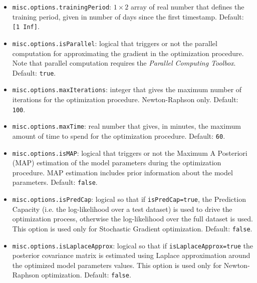 \begin{itemize}
\begin{itemize}
\item \lstinline[basicstyle = \mlttfamily \small ]!misc.options.trainingPeriod!:  $1\times2$ array of real number that defines the training period, given in number of days since the first timestamp. Default: \lstinline[basicstyle = \mlttfamily \small ]![1 Inf]!. 
\item \lstinline[basicstyle = \mlttfamily \small ]!misc.options.isParallel!: logical that triggers or not the parallel computation for approximating the gradient in the optimization procedure. Note that parallel computation requires the \MATLAB{} \emph{Parallel Computing Toolbox}. Default: \lstinline[basicstyle = \mlttfamily \small ]!true!.
\item \lstinline[basicstyle = \mlttfamily \small ]!misc.options.maxIterations!: integer that gives the maximum number of iterations for the optimization procedure. Newton-Raphson only. Default: \lstinline[basicstyle = \mlttfamily \small ]!100!.
\item \lstinline[basicstyle = \mlttfamily \small ]!misc.options.maxTime!: real number that gives, in minutes, the maximum amount of  time to spend for the optimization procedure. Default: \lstinline[basicstyle = \mlttfamily \small ]!60!.
\item \lstinline[basicstyle = \mlttfamily \small ]!misc.options.isMAP!: logical that triggers or not the Maximum A Posteriori (MAP) estimation of the model parameters during the optimization procedure. MAP estimation includes prior information about the model parameters. Default: \lstinline[basicstyle = \mlttfamily \small ]!false!.
\item \lstinline[basicstyle = \mlttfamily \small ]!misc.options.isPredCap!: logical so that if \lstinline[basicstyle = \mlttfamily \small ]!isPredCap=true!, the Prediction Capacity (i.e. the log-likelihood over a test dataset) is used to drive the optimization process, otherwise the log-likelihood over the full dataset is used. This option is used only for Stochastic Gradient optimization. Default: \lstinline[basicstyle = \mlttfamily \small ]!false!.
\item \lstinline[basicstyle = \mlttfamily \small ]!misc.options.isLaplaceApprox!: logical so that if \lstinline[basicstyle = \mlttfamily \small ]!isLaplaceApprox=true! the posterior covariance matrix is estimated using Laplace approximation around the optimized model parameters values. This option is used only for Newton-Raphson optimization. Default: \lstinline[basicstyle = \mlttfamily \small ]!false!.

\end{itemize}
\end{itemize}

